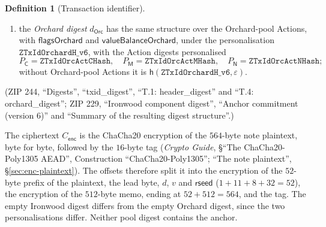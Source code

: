 \documentclass[11pt,a4paper]{article}
\theoremstyle{definition}
\newtheorem{definition}[theorem]{Definition}
\begin{document}
\begin{definition}[Transaction identifier]
\begin{enumerate}[label=(\roman*)]
\begin{align*}
  \end{align*}
  for $n = 0$ it is
  $d_{\mathsf{Irw}} := \mathsf{h}(\texttt{ZTxIdIronwd\_H\_v6},
  \varepsilon)$;
\item the \emph{Orchard digest} $d_{\mathsf{Orc}}$ has the same structure
  over the Orchard-pool Actions, with $\mathsf{flagsOrchard}$ and
  $\mathsf{valueBalanceOrchard}$, under the personalisation
  $\texttt{ZTxIdOrchardH\_v6}$, with the Action digests personalised
  \[
    P_{\mathsf{C}} = \texttt{ZTxIdOrcActCHash}, \quad
    P_{\mathsf{M}} = \texttt{ZTxIdOrcActMHash}, \quad
    P_{\mathsf{N}} = \texttt{ZTxIdOrcActNHash};
  \]
  without Orchard-pool Actions it is
  $\mathsf{h}(\texttt{ZTxIdOrchardH\_v6}, \varepsilon)$.
\end{enumerate}
(ZIP 244, ``Digests'', ``txid\_digest'', ``T.1: header\_digest'' and ``T.4:
orchard\_digest''; ZIP 229, ``Ironwood component digest'', ``Anchor
commitment (version 6)'' and ``Summary of the resulting digest
structure''.)
\end{definition}

The ciphertext $C_{\mathsf{enc}}$ is the ChaCha20 encryption of the
$564$-byte note plaintext, byte for byte, followed by the $16$-byte tag
(\emph{Crypto Guide}, \S``The ChaCha20-Poly1305 AEAD'', Construction
``ChaCha20-Poly1305''; ``The note plaintext'', \S\ref{sec:enc-plaintext}).
The offsets therefore split it into the encryption of the $52$-byte prefix
of the plaintext, the lead byte, $d$, $v$ and $\mathsf{rseed}$
($1 + 11 + 8 + 32 = 52$), the encryption of the $512$-byte memo, ending at
$52 + 512 = 564$, and the tag. The empty Ironwood digest differs from the
empty Orchard digest, since the two personalisations differ. Neither pool
digest contains the anchor.
\end{document}

